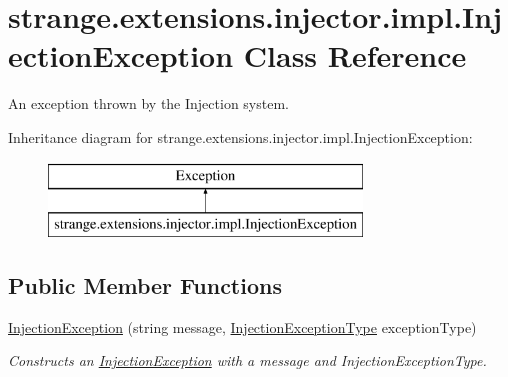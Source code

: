 \hypertarget{classstrange_1_1extensions_1_1injector_1_1impl_1_1_injection_exception}{\section{strange.\-extensions.\-injector.\-impl.\-Injection\-Exception Class Reference}
\label{classstrange_1_1extensions_1_1injector_1_1impl_1_1_injection_exception}
}


An exception thrown by the Injection system.  


Inheritance diagram for strange.\-extensions.\-injector.\-impl.\-Injection\-Exception\-:\begin{figure}[H]
\begin{center}
\leavevmode
\includegraphics[height=2.000000cm]{classstrange_1_1extensions_1_1injector_1_1impl_1_1_injection_exception}
\end{center}
\end{figure}
\subsection*{Public Member Functions}
\begin{DoxyCompactItemize}
\item 
\hypertarget{classstrange_1_1extensions_1_1injector_1_1impl_1_1_injection_exception_a38355a2ef4b36ae9d01bf1c5cc321482}{\hyperlink{classstrange_1_1extensions_1_1injector_1_1impl_1_1_injection_exception_a38355a2ef4b36ae9d01bf1c5cc321482}{Injection\-Exception} (string message, \hyperlink{namespacestrange_1_1extensions_1_1injector_1_1api_a465caee64cba80e952ad7dd9a050e6c3}{Injection\-Exception\-Type} exception\-Type)}\label{classstrange_1_1extensions_1_1injector_1_1impl_1_1_injection_exception_a38355a2ef4b36ae9d01bf1c5cc321482}

\begin{DoxyCompactList}\small\item\em Constructs an \hyperlink{classstrange_1_1extensions_1_1injector_1_1impl_1_1_injection_exception}{Injection\-Exception} with a message and Injection\-Exception\-Type. \end{DoxyCompactList}\end{DoxyCompactItemize}
